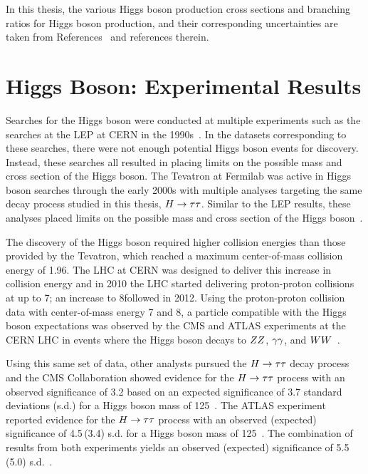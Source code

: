 In this thesis, the various Higgs boson production cross sections and branching ratios
for Higgs boson production, and their corresponding uncertainties are taken from 
References~\cite{deFlorian:2016spz,Denner:2011mq,Ball:2011mu} and references therein.


\section{Higgs Boson: Experimental Results}
Searches for the Higgs boson were conducted at multiple experiments such as the searches
at the LEP at CERN in the 1990s~\cite{Barate:2000ts,Abdallah:2003ip,Achard:2001pj,Abbiendi:2000ac}.
In the datasets corresponding to these searches, there were not enough potential Higgs
boson events for discovery.
Instead, these searches all resulted in placing limits on the possible mass and cross section
of the Higgs boson. The Tevatron at Fermilab was active in Higgs boson searches through the early 2000s
with multiple analyses targeting the same decay process studied in this thesis, $H\to\tau\tau$. 
Similar to the LEP results, these analyses
placed limits on the possible mass and cross section of the Higgs boson~\cite{Aaltonen:2012jh, Abazov:2012zj}.

The discovery of the Higgs boson required higher collision energies than those provided
by the Tevatron, which reached a maximum center-of-mass collision energy of 1.96\TeV. The
LHC at CERN was designed to deliver this increase in collision energy and in 2010 the LHC started
delivering proton-proton collisions at up to 7\TeV; an increase to 8\TeV followed in 2012.
Using the proton-proton collision data with center-of-mass energy 7 and 8\TeV,
a particle compatible with the Higgs boson expectations was observed by the CMS and ATLAS experiments at the CERN LHC
in events where the Higgs boson decays to $ZZ$, $\gamma\gamma$, and 
$WW$~\cite{Aad:2012tfa, Chatrchyan:2012xdj, Chatrchyan:2013lba}.

Using this same set of data, other analysts pursued the $H\to\tau\tau$ decay process and
the CMS Collaboration showed evidence for the $H\to\tau\tau$ process with an observed
significance of 3.2 based on an expected significance of 3.7 standard deviations (s.d.)
for a Higgs boson mass of 125\GeV~\cite{Chatrchyan:2014nva}.
The ATLAS experiment reported evidence for the $H\to\tau\tau$ process 
with an observed (expected) significance of 4.5\,(3.4)
s.d. for a Higgs boson mass of 125\GeV~\cite{Aad:2015vsa}.
The combination of results from both experiments yields an observed (expected)
significance of 5.5\,(5.0) s.d.~\cite{Khachatryan:2016vau}.

